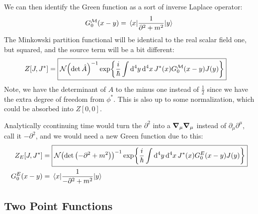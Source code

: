 \documentclass[12pt]{article}
\newcommand{\D}{\partial}
\newcommand{\phis}{\phi^*}
\begin{document}
We can then identify the Green function as a sort of inverse Laplace operator:
\begin{align*}
  G_0^{\mathcal{M}}(x-y)=\mel{x}{\frac{1}{\D^2+m^2}}{y}
\end{align*}
The Minkowski partition functional will be identical to the real scalar field one, but squared, and the source term will be a bit different:
\begin{align*}
  Z[J,J^*]&=\boxed{\mathcal{N}\qty(\det\hat{A})^{-1}
    \exp{\frac{i}{\hbar}\int\dd[4]{y}\dd[4]{x}J^*(x)G_0^{\mathcal{M}}(x-y)J(y)}}
\end{align*}
Note, we have the determinant of $A$ to the minus one instead of $\frac{1}{2}$ since we have the extra degree of freedom from $\phis$. This is also up to some normalization, which could be absorbed into $Z[0,0]$.

Analytically ccontinuing time would turn the $\D^2$ into a $\grad_\mu\grad_\mu$ instead of $\D_\mu\D^\mu$, call it $-\D^2$, and we would need a new Green function due to this:
\begin{align*}
  Z_E[J,J^*]&=\boxed{\mathcal{N}\qty(\det\qty(-\D^2+m^2))^{-1}
    \exp{\frac{i}{\hbar}\int\dd[4]{y}\dd[4]{x}J^*(x)G_0^E(x-y)J(y)}}\\
  G_0^E(x-y)&=\mel{x}{\frac{1}{-\D^2+m^2}}{y}
\end{align*}
\subsection{Two Point Functions}
\end{document}
